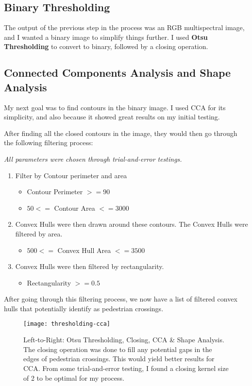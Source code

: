 \documentclass{article}  %
\begin{document}
	\subsection{Binary Thresholding}
	
	The output of the previous step in the process was an RGB multispectral image, and I wanted a binary image to simplify things further. I used \textbf{Otsu Thresholding} to convert to binary, followed by a closing operation.
	
	\subsection{Connected Components Analysis and Shape Analysis}\label{cca}
	
	My next goal was to find contours in the binary image. I used CCA for its simplicity, and also because it showed great results on my initial testing.
	
	After finding all the closed contours in the image, they would then go through the following filtering process:
	
	\emph{All parameters were chosen through trial-and-error testings.}
	
	\begin{enumerate}
		\item Filter by Contour perimeter and area
		\begin{itemize}
			\item Contour Perimeter $>= 90$
			\item $50 <= $ Contour Area $ <= 3000$
		\end{itemize}
		\item Convex Hulls were then drawn around these contours. The Convex Hulls were filtered by area.
		\begin{itemize}
			\item $500 <= $ Convex Hull Area $ <= 3500$
		\end{itemize}
		\item Convex Hulls were then filtered by rectangularity.
		\begin{itemize}
			\item Rectangularity $>= 0.5$
		\end{itemize}
	\end{enumerate}
	
	After going through this filtering process, we now have a list of filtered convex hulls that potentially identify as pedestrian crossings.
	
	\begin{figure}[H]
		\centering
		\texttt{[image: thresholding-cca]}
		\caption{Left-to-Right: Otsu Thresholding, Closing, CCA \& Shape Analysis. The closing operation was done to fill any potential gaps in the edges of pedestrian crossings. This would yield better results for CCA. From some trial-and-error testing, I found a closing kernel size of 2 to be optimal for my process.}
	\end{figure}
\end{document}
